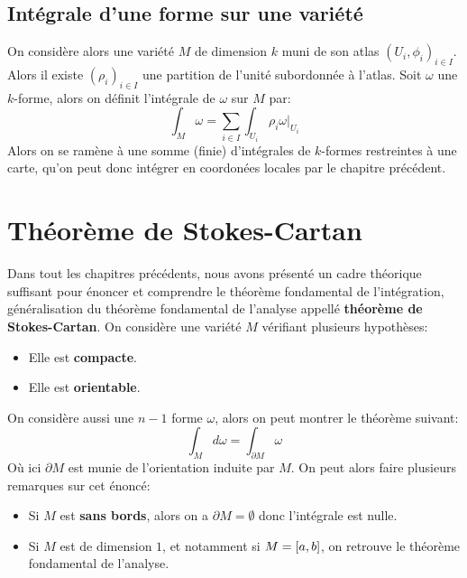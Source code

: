 \section{Intégrale d'une forme sur une variété}
On considère alors une variété \( M \) de dimension \( k \) muni de son atlas \( (U_i, \phi_i)_{i \in I} \). Alors il existe \( (\rho_i)_{i \in I} \) une partition de l'unité subordonnée à l'atlas. Soit \( \omega \) une \( k \)-forme, alors on définit l'intégrale de \( \omega \) sur \( M \) par:
\[ 
   \int_M \omega = \sum_{i \in I} \int_{U_i} \rho_i\omega \bigr|_{U_i}
\]
Alors on se ramène à une somme (finie) d'intégrales de \( k \)-formes restreintes à une carte, qu'on peut donc intégrer en coordonées locales par le chapitre précédent.
\chapter{Théorème de Stokes-Cartan}
Dans tout les chapitres précédents, nous avons présenté un cadre théorique suffisant pour énoncer et comprendre le théorème fondamental de l'intégration, généralisation du théorème fondamental de l'analyse appellé \textbf{théorème de Stokes-Cartan}. On considère une variété \( M \) vérifiant plusieurs hypothèses:
\begin{itemize}
   \item Elle est \textbf{compacte}.
   \item Elle est \textbf{orientable}.
\end{itemize}
On considère aussi une \( n-1 \) forme \( \omega \), alors on peut montrer le théorème suivant:
\[ 
   \int_M d\omega = \int_{\partial M} \omega
\]
Où ici \( \partial M \) est munie de l'orientation induite par \( M \). On peut alors faire plusieurs remarques sur cet énoncé:
\begin{itemize}
   \item Si \( M \) est \textbf{sans bords}, alors on a \( \partial M = \emptyset \) donc l'intégrale est nulle.
   \item Si \( M \) est de dimension \( 1 \), et notamment si \( M = \icc{a}{b} \), on retrouve le théorème fondamental de l'analyse.
\end{itemize}
